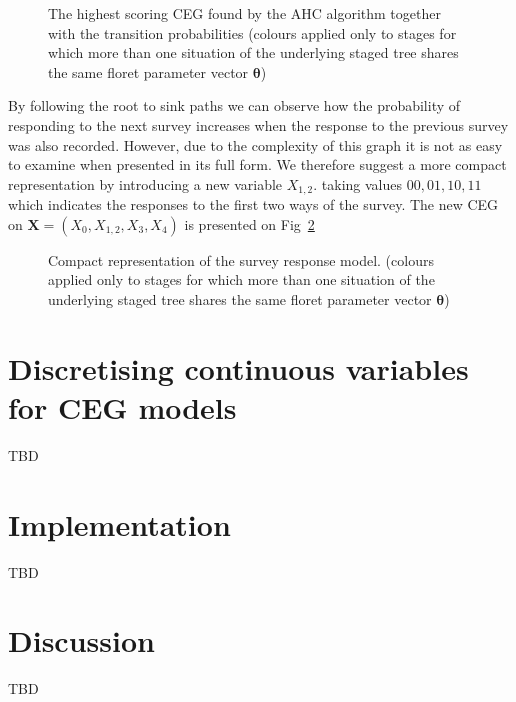 \documentclass[runningheads]{llncs}
\begin{document}
\begin{figure}
\centering

\vspace{1ex}
\caption{The highest scoring CEG found by the AHC algorithm together with the transition probabilities (colours applied only to stages for which more than one situation of the underlying staged tree shares the same floret parameter vector $\boldsymbol{\theta}$)}
\label{ceg:ahc-responses}
\end{figure}
By following the root to sink paths we can observe how the probability of responding to the next survey increases when the response to the previous survey was also recorded. However, due to the complexity of this graph it is not as easy to examine when presented in its full form. We therefore suggest a more compact representation by introducing a new variable $X_{1,2}$. taking values ${00, 01, 10, 11}$ which indicates the responses to the first two ways of the survey. The new CEG on $\boldsymbol{X} = (X_0, X_{1,2}, X_3, X_4)$ is presented on Fig~\ref{ceg:compact-responses}
\begin{figure}
\centering

\vspace{1ex}
\caption{Compact representation of the survey response model. (colours applied only to stages for which more than one situation of the underlying staged tree shares the same floret parameter vector $\boldsymbol{\theta}$)}
\label{ceg:compact-responses}
\end{figure}

\section{Discretising continuous variables for CEG models}\label{sec:best-fit-dropout}
TBD

\section{Implementation}
TBD

\section{Discussion}
TBD



%


%
\end{document}
